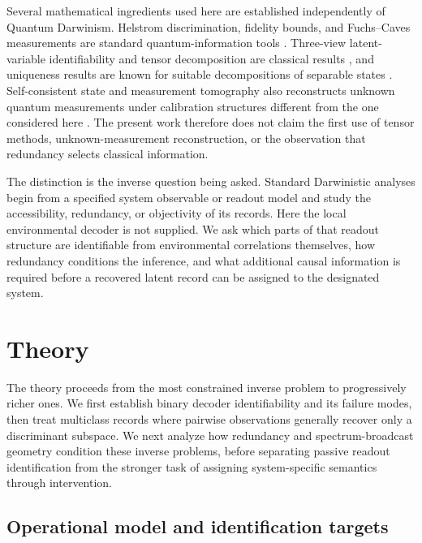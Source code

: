 Several mathematical ingredients used here are established independently of Quantum Darwinism.  Helstrom discrimination, fidelity bounds, and Fuchs--Caves measurements are standard quantum-information tools \cite{helstrom1976,fuchscaves1996,fuchsvandegraaf1999}.  Three-view latent-variable identifiability and tensor decomposition are classical results \cite{allman2009,anandkumar2014,bhaskara2014,sidiropoulos2017}, and uniqueness results are known for suitable decompositions of separable states \cite{alfsen2012}.  Self-consistent state and measurement tomography also reconstructs unknown quantum measurements under calibration structures different from the one considered here \cite{stephens2021,cattaneo2023}.  The present work therefore does not claim the first use of tensor methods, unknown-measurement reconstruction, or the observation that redundancy selects classical information.

The distinction is the inverse question being asked.  Standard Darwinistic analyses begin from a specified system observable or readout model and study the accessibility, redundancy, or objectivity of its records.  Here the local environmental decoder is not supplied.  We ask which parts of that readout structure are identifiable from environmental correlations themselves, how redundancy conditions the inference, and what additional causal information is required before a recovered latent record can be assigned to the designated system.

\section{Theory}
\label{sec:theory}

The theory proceeds from the most constrained inverse problem to progressively richer ones.  We first establish binary decoder identifiability and its failure modes, then treat multiclass records where pairwise observations generally recover only a discriminant subspace.  We next analyze how redundancy and spectrum-broadcast geometry condition these inverse problems, before separating passive readout identification from the stronger task of assigning system-specific semantics through intervention.

\subsection{Operational model and identification targets}
\label{sec:model}

